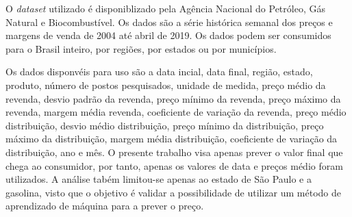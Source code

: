 
O \textit{dataset} utilizado é disponiblizado pela Agência Nacional do Petróleo, Gás Natural e Biocombustível.
Os dados são a série histórica semanal dos preços e margens de venda de 2004 até abril de 2019. Os dados
podem ser consumidos para o Brasil inteiro, por regiões, por estados ou por municípios.

Os dados disponvéis para uso são a data incial, data final, região, estado,
produto, número de postos pesquisados, unidade de medida, preço médio da revenda,
desvio padrão da revenda, preço mínimo da revenda, preço máximo da revenda,
margem média revenda, coeficiente de variação da revenda, preço médio distribuição,
desvio médio distribuição, preço mínimo da distribuição, preço máximo da distribuição,
margem média distribuição, coeficiente de variação da distribuição, ano e mês.
O presente trabalho visa apenas prever o valor final que chega ao consumidor, por tanto,
apenas os valores de data e preços médio foram utilizados. A análise tabém
limitou-se apenas ao estado de São Paulo e a gasolina, visto que o objetivo
é validar a possibilidade de utilizar um método de aprendizado de máquina para a prever
o preço.
